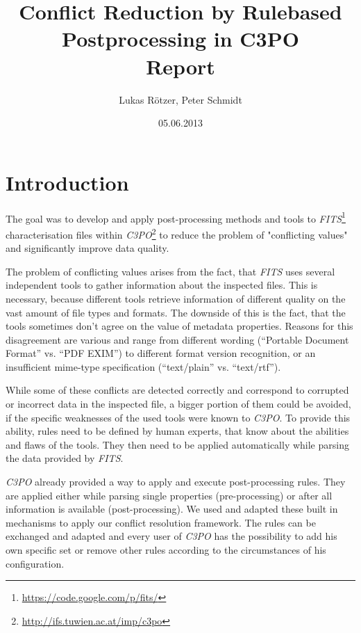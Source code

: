 \documentclass[a4paper,12pt]{article}
\title{Conflict Reduction by Rulebased Postprocessing in C3PO\\ \medskip Report}
\author{Lukas Rötzer, Peter Schmidt}
\date{05.06.2013}
\begin{document}
\maketitle
\thispagestyle{empty}

\clearpage



\section{Introduction}

The goal was to develop and apply post-processing methods and tools to \emph{FITS}\footnote{\url{https://code.google.com/p/fits/}} characterisation files within \emph{C3PO}\footnote{\url{http://ifs.tuwien.ac.at/imp/c3po}} to reduce the problem of "conflicting values" and significantly improve data quality. 

The problem of conflicting values arises from the fact, that \emph{FITS} uses several independent tools to gather information about the inspected files. This is necessary, because different tools retrieve information of different quality on the vast amount of file types and formats. The downside of this is the fact, that the tools sometimes don't agree on the value of metadata properties. Reasons for this disagreement are various and range from different wording (``Portable Document Format'' vs. ``PDF EXIM'') to different format version recognition, or an insufficient mime-type specification (``text/plain'' vs. ``text/rtf''). 

While some of these conflicts are detected correctly and correspond to corrupted or incorrect data in the inspected file, a bigger portion of them could be avoided, if the specific weaknesses of the used tools were known to \emph{C3PO}. To provide this ability, rules need to be defined by human experts, that know about the abilities and flaws of the tools. They then need to be applied automatically while parsing the data provided by \emph{FITS}. 

\emph{C3PO} already provided a way to apply and execute post-processing rules. They are applied either while parsing single properties (pre-processing) or after all information is available (post-processing). We used and adapted these built in mechanisms to apply our conflict resolution framework. The rules can be exchanged and adapted and every user of \emph{C3PO} has the possibility to add his own specific set or remove other rules according to the circumstances of his configuration.
\end{document}
